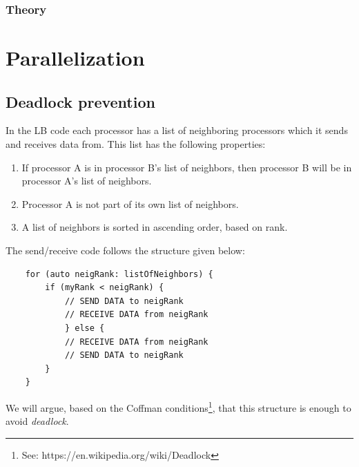 \documentclass[11pt,a4paper]{report}
\begin{document}
\subsection{Theory}   




\appendix


\chapter{Parallelization}\label{sec:parallelization}

\section{Deadlock prevention}
In the LB code each processor has a list of neighboring processors which it sends and receives data from. This list has the following properties:
\begin{enumerate}
	\item If processor A is in processor B's list of neighbors, then processor B will be in
	processor A's list of neighbors.
	\item Processor A is not part of its own list of neighbors.
	\item A list of neighbors is sorted in ascending order, based on rank.
\end{enumerate}
The send/receive code follows the structure given below:
\begin{verbatim}
    for (auto neigRank: listOfNeighbors) {
        if (myRank < neigRank) {
            // SEND DATA to neigRank
            // RECEIVE DATA from neigRank
            } else {
            // RECEIVE DATA from neigRank
            // SEND DATA to neigRank
        }
    }
\end{verbatim}
We will argue, based  on the Coffman conditions\footnote{See: https://en.wikipedia.org/wiki/Deadlock}, that this structure is enough to avoid \emph{deadlock}. 
\end{document}
